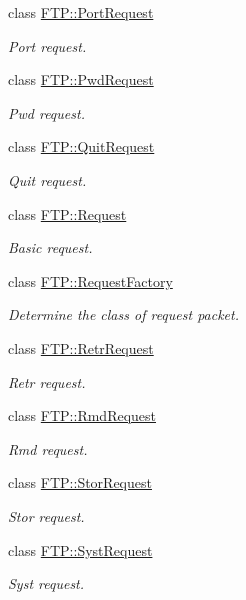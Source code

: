 \begin{DoxyCompactItemize}
class \hyperlink{classFTP_1_1PortRequest}{F\+T\+P\+::\+Port\+Request}
\begin{DoxyCompactList}\small\item\em Port request. \end{DoxyCompactList}\item 
class \hyperlink{classFTP_1_1PwdRequest}{F\+T\+P\+::\+Pwd\+Request}
\begin{DoxyCompactList}\small\item\em Pwd request. \end{DoxyCompactList}\item 
class \hyperlink{classFTP_1_1QuitRequest}{F\+T\+P\+::\+Quit\+Request}
\begin{DoxyCompactList}\small\item\em Quit request. \end{DoxyCompactList}\item 
class \hyperlink{classFTP_1_1Request}{F\+T\+P\+::\+Request}
\begin{DoxyCompactList}\small\item\em Basic request. \end{DoxyCompactList}\item 
class \hyperlink{classFTP_1_1RequestFactory}{F\+T\+P\+::\+Request\+Factory}
\begin{DoxyCompactList}\small\item\em Determine the class of request packet. \end{DoxyCompactList}\item 
class \hyperlink{classFTP_1_1RetrRequest}{F\+T\+P\+::\+Retr\+Request}
\begin{DoxyCompactList}\small\item\em Retr request. \end{DoxyCompactList}\item 
class \hyperlink{classFTP_1_1RmdRequest}{F\+T\+P\+::\+Rmd\+Request}
\begin{DoxyCompactList}\small\item\em Rmd request. \end{DoxyCompactList}\item 
class \hyperlink{classFTP_1_1StorRequest}{F\+T\+P\+::\+Stor\+Request}
\begin{DoxyCompactList}\small\item\em Stor request. \end{DoxyCompactList}\item 
class \hyperlink{classFTP_1_1SystRequest}{F\+T\+P\+::\+Syst\+Request}
\begin{DoxyCompactList}\small\item\em Syst request. \end{DoxyCompactList}\item 

\end{DoxyCompactItemize}
